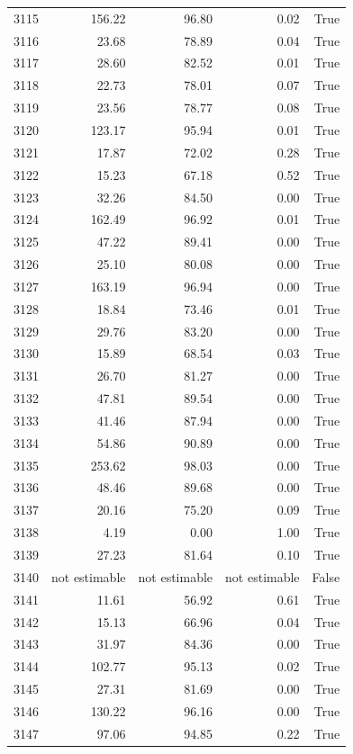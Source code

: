 \begin{longtable}{rrrrr}
3115 & 156.22 & 96.80 & 0.02 & True \\
3116 & 23.68 & 78.89 & 0.04 & True \\
3117 & 28.60 & 82.52 & 0.01 & True \\
3118 & 22.73 & 78.01 & 0.07 & True \\
3119 & 23.56 & 78.77 & 0.08 & True \\
3120 & 123.17 & 95.94 & 0.01 & True \\
3121 & 17.87 & 72.02 & 0.28 & True \\
3122 & 15.23 & 67.18 & 0.52 & True \\
3123 & 32.26 & 84.50 & 0.00 & True \\
3124 & 162.49 & 96.92 & 0.01 & True \\
3125 & 47.22 & 89.41 & 0.00 & True \\
3126 & 25.10 & 80.08 & 0.00 & True \\
3127 & 163.19 & 96.94 & 0.00 & True \\
3128 & 18.84 & 73.46 & 0.01 & True \\
3129 & 29.76 & 83.20 & 0.00 & True \\
3130 & 15.89 & 68.54 & 0.03 & True \\
3131 & 26.70 & 81.27 & 0.00 & True \\
3132 & 47.81 & 89.54 & 0.00 & True \\
3133 & 41.46 & 87.94 & 0.00 & True \\
3134 & 54.86 & 90.89 & 0.00 & True \\
3135 & 253.62 & 98.03 & 0.00 & True \\
3136 & 48.46 & 89.68 & 0.00 & True \\
3137 & 20.16 & 75.20 & 0.09 & True \\
3138 & 4.19 & 0.00 & 1.00 & True \\
3139 & 27.23 & 81.64 & 0.10 & True \\
3140 & not estimable & not estimable & not estimable & False \\
3141 & 11.61 & 56.92 & 0.61 & True \\
3142 & 15.13 & 66.96 & 0.04 & True \\
3143 & 31.97 & 84.36 & 0.00 & True \\
3144 & 102.77 & 95.13 & 0.02 & True \\
3145 & 27.31 & 81.69 & 0.00 & True \\
3146 & 130.22 & 96.16 & 0.00 & True \\
3147 & 97.06 & 94.85 & 0.22 & True \\

\end{longtable}
